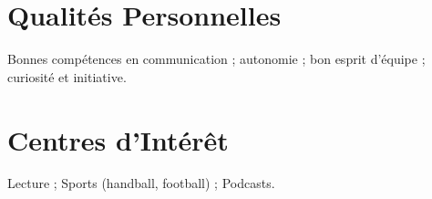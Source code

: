 \documentclass[letterpaper,10pt]{article}
\begin{document}

\section{Qualités Personnelles}
Bonnes compétences en communication ; autonomie ; bon esprit d’équipe ; curiosité et initiative.


\section{Centres d’Intérêt}
Lecture ; Sports (handball, football) ; Podcasts.
\end{document}
